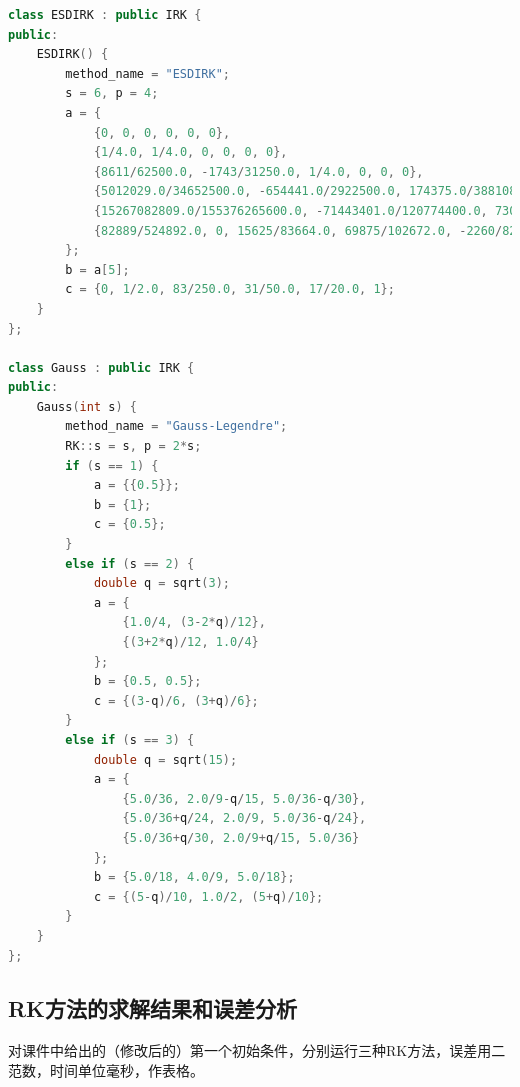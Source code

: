 \documentclass{ctexart}
\begin{document}
\begin{lstlisting}[language=c++]
class ESDIRK : public IRK {
public:
	ESDIRK() {
		method_name = "ESDIRK";
		s = 6, p = 4;
		a = {
			{0, 0, 0, 0, 0, 0},
			{1/4.0, 1/4.0, 0, 0, 0, 0},
			{8611/62500.0, -1743/31250.0, 1/4.0, 0, 0, 0},
			{5012029.0/34652500.0, -654441.0/2922500.0, 174375.0/388108.0, 1/4.0, 0, 0},
			{15267082809.0/155376265600.0, -71443401.0/120774400.0, 730878875.0/902184768.0, 2285395.0/8070912.0, 1/4.0, 0},
			{82889/524892.0, 0, 15625/83664.0, 69875/102672.0, -2260/8211.0, 1/4.0}
		};
		b = a[5];
		c = {0, 1/2.0, 83/250.0, 31/50.0, 17/20.0, 1};
	}
};

class Gauss : public IRK {
public:
	Gauss(int s) {
		method_name = "Gauss-Legendre";
		RK::s = s, p = 2*s;
		if (s == 1) {
			a = {{0.5}};
			b = {1};
			c = {0.5};
		}
		else if (s == 2) {
			double q = sqrt(3);
			a = {
				{1.0/4, (3-2*q)/12},
				{(3+2*q)/12, 1.0/4}
			};
			b = {0.5, 0.5};
			c = {(3-q)/6, (3+q)/6};
		}
		else if (s == 3) {
			double q = sqrt(15);
			a = {
				{5.0/36, 2.0/9-q/15, 5.0/36-q/30},
				{5.0/36+q/24, 2.0/9, 5.0/36-q/24},
				{5.0/36+q/30, 2.0/9+q/15, 5.0/36}
			};
			b = {5.0/18, 4.0/9, 5.0/18};
			c = {(5-q)/10, 1.0/2, (5+q)/10};
		}
	}
};
\end{lstlisting}

\subsection{RK方法的求解结果和误差分析}

对课件中给出的（修改后的）第一个初始条件，分别运行三种RK方法，误差用二范数，时间单位毫秒，作表格。

\begin{table}\centering
	\caption{各种RK方法的误差和效率}
\end{table}
\end{document}
